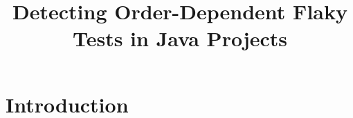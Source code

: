 \documentclass[10pt,conference]{IEEEtran}
\begin{document}
\title{\LARGE Detecting Order-Dependent Flaky Tests in Java Projects}
\author{}
\maketitle
\section{Introduction}
\lipsum[1-4]
\end{document}
